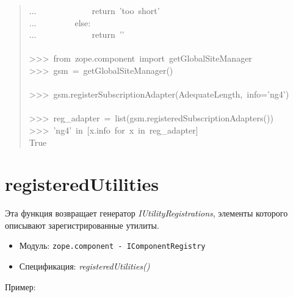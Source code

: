 \documentclass[a4paper,openany,twoside,final]{book}
\providecommand*{\DUroletitlereference}[1]{\textsl{#1}}
\begin{document}
\begin{quote}
{...~~~~~~~~~~~~~return~'too~short'\\
...~~~~~~~~~else:\\
...~~~~~~~~~~~~~return~'{}'\\
~\\
>{}>{}>~from~zope.component~import~getGlobalSiteManager\\
>{}>{}>~gsm~=~getGlobalSiteManager()\\
~\\
>{}>{}>~gsm.registerSubscriptionAdapter(AdequateLength,~info='ng4')\\
~\\
>{}>{}>~reg\_adapter~=~list(gsm.registeredSubscriptionAdapters())\\
>{}>{}>~'ng4'~in~{[}x.info~for~x~in~reg\_adapter{]}\\
True
}
\end{quote}


\section*{registeredUtilities%
  \label{registeredutilities}%
}

Эта функция возвращает генератор \DUroletitlereference{IUtilityRegistrations}, элементы
которого описывают зарегистрированные утилиты.

\begin{itemize}

\item Модуль: \texttt{zope.component - IComponentRegistry}

\item Спецификация: \DUroletitlereference{registeredUtilities()}

\end{itemize}

Пример:
\end{document}
